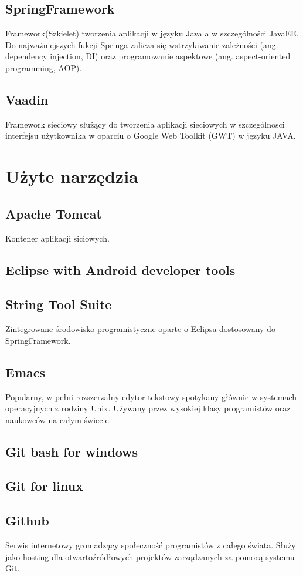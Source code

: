 \documentclass[11pt,a4paper,polish,thesis]{dcsbook}
\begin{document}
\subsection{SpringFramework}
Framework(Szkielet) tworzenia aplikacji w języku Java a w szczególności JavaEE. Do najważniejszych fukcji Springa zalicza się wstrzykiwanie zależności (ang. dependency injection, DI) oraz programowanie aspektowe (ang. aspect-oriented programming, AOP).  
\subsection{Vaadin}
Framework sieciowy służący do tworzenia aplikacji sieciowych w szczególnosci interfejsu użytkownika w oparciu o Google Web Toolkit (GWT) w języku JAVA.


\section{Użyte narzędzia}
\subsection{Apache Tomcat}
Kontener aplikacji siciowych.
\subsection{Eclipse with Android developer tools}
\subsection{String Tool Suite}
Zintegrowane środowisko programistyczne oparte o Eclipsa dostosowany do SpringFramework.
\subsection{Emacs}
Popularny, w pełni rozszerzalny edytor tekstowy spotykany głównie w systemach operacyjnych z rodziny Unix. Używany przez wysokiej klasy programistów oraz naukowców na całym świecie.
\subsection{Git bash for windows}
\subsection{Git for linux}
\subsection{Github}
Serwis internetowy gromadzący społeczność programistów z całego świata. Służy jako hosting dla otwartoźródłowych projektów zarządzanych za pomocą systemu Git.
\end{document}
